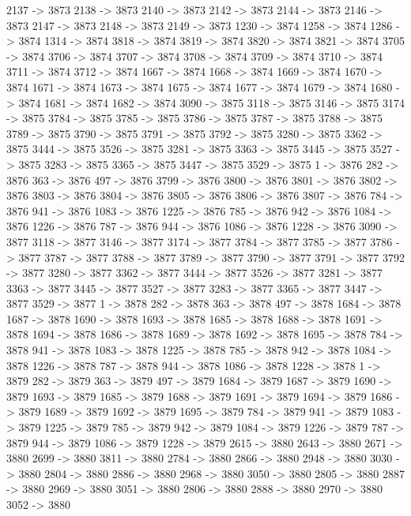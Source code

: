 {	2137 -> 3873
	2138 -> 3873
	2140 -> 3873
	2142 -> 3873
	2144 -> 3873
	2146 -> 3873
	2147 -> 3873
	2148 -> 3873
	2149 -> 3873
	1230 -> 3874
	1258 -> 3874
	1286 -> 3874
	1314 -> 3874
	3818 -> 3874
	3819 -> 3874
	3820 -> 3874
	3821 -> 3874
	3705 -> 3874
	3706 -> 3874
	3707 -> 3874
	3708 -> 3874
	3709 -> 3874
	3710 -> 3874
	3711 -> 3874
	3712 -> 3874
	1667 -> 3874
	1668 -> 3874
	1669 -> 3874
	1670 -> 3874
	1671 -> 3874
	1673 -> 3874
	1675 -> 3874
	1677 -> 3874
	1679 -> 3874
	1680 -> 3874
	1681 -> 3874
	1682 -> 3874
	3090 -> 3875
	3118 -> 3875
	3146 -> 3875
	3174 -> 3875
	3784 -> 3875
	3785 -> 3875
	3786 -> 3875
	3787 -> 3875
	3788 -> 3875
	3789 -> 3875
	3790 -> 3875
	3791 -> 3875
	3792 -> 3875
	3280 -> 3875
	3362 -> 3875
	3444 -> 3875
	3526 -> 3875
	3281 -> 3875
	3363 -> 3875
	3445 -> 3875
	3527 -> 3875
	3283 -> 3875
	3365 -> 3875
	3447 -> 3875
	3529 -> 3875
	1 -> 3876
	282 -> 3876
	363 -> 3876
	497 -> 3876
	3799 -> 3876
	3800 -> 3876
	3801 -> 3876
	3802 -> 3876
	3803 -> 3876
	3804 -> 3876
	3805 -> 3876
	3806 -> 3876
	3807 -> 3876
	784 -> 3876
	941 -> 3876
	1083 -> 3876
	1225 -> 3876
	785 -> 3876
	942 -> 3876
	1084 -> 3876
	1226 -> 3876
	787 -> 3876
	944 -> 3876
	1086 -> 3876
	1228 -> 3876
	3090 -> 3877
	3118 -> 3877
	3146 -> 3877
	3174 -> 3877
	3784 -> 3877
	3785 -> 3877
	3786 -> 3877
	3787 -> 3877
	3788 -> 3877
	3789 -> 3877
	3790 -> 3877
	3791 -> 3877
	3792 -> 3877
	3280 -> 3877
	3362 -> 3877
	3444 -> 3877
	3526 -> 3877
	3281 -> 3877
	3363 -> 3877
	3445 -> 3877
	3527 -> 3877
	3283 -> 3877
	3365 -> 3877
	3447 -> 3877
	3529 -> 3877
	1 -> 3878
	282 -> 3878
	363 -> 3878
	497 -> 3878
	1684 -> 3878
	1687 -> 3878
	1690 -> 3878
	1693 -> 3878
	1685 -> 3878
	1688 -> 3878
	1691 -> 3878
	1694 -> 3878
	1686 -> 3878
	1689 -> 3878
	1692 -> 3878
	1695 -> 3878
	784 -> 3878
	941 -> 3878
	1083 -> 3878
	1225 -> 3878
	785 -> 3878
	942 -> 3878
	1084 -> 3878
	1226 -> 3878
	787 -> 3878
	944 -> 3878
	1086 -> 3878
	1228 -> 3878
	1 -> 3879
	282 -> 3879
	363 -> 3879
	497 -> 3879
	1684 -> 3879
	1687 -> 3879
	1690 -> 3879
	1693 -> 3879
	1685 -> 3879
	1688 -> 3879
	1691 -> 3879
	1694 -> 3879
	1686 -> 3879
	1689 -> 3879
	1692 -> 3879
	1695 -> 3879
	784 -> 3879
	941 -> 3879
	1083 -> 3879
	1225 -> 3879
	785 -> 3879
	942 -> 3879
	1084 -> 3879
	1226 -> 3879
	787 -> 3879
	944 -> 3879
	1086 -> 3879
	1228 -> 3879
	2615 -> 3880
	2643 -> 3880
	2671 -> 3880
	2699 -> 3880
	3811 -> 3880
	2784 -> 3880
	2866 -> 3880
	2948 -> 3880
	3030 -> 3880
	2804 -> 3880
	2886 -> 3880
	2968 -> 3880
	3050 -> 3880
	2805 -> 3880
	2887 -> 3880
	2969 -> 3880
	3051 -> 3880
	2806 -> 3880
	2888 -> 3880
	2970 -> 3880
	3052 -> 3880
}
